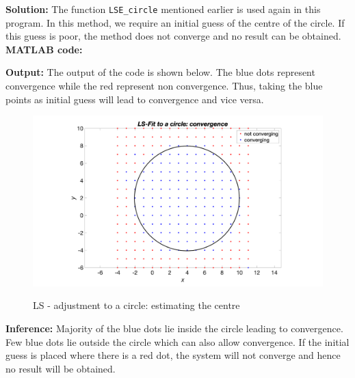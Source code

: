 \noindent \textbf{Solution:} The function \texttt{LSE\_circle} mentioned earlier is used again in this program. In this method, we require an initial guess of the centre of the circle. If this guess is poor, the method does not converge and no result can be obtained.
\noindent \textbf{MATLAB code:} 


\noindent \textbf{Output:} The output of the code is shown below. The blue dots represent convergence while the red represent non convergence. Thus, taking the blue points as initial guess will lead to convergence and vice versa.
\begin{figure}[H]
\centering
{\includegraphics[scale=0.15]{ass8_1.png}}
\caption{LS - adjustment to a circle: estimating the centre }
\label{LS - adjustment to a circle: estimating the centre }
\end{figure}

\noindent \textbf{Inference:} Majority of the blue dots lie inside the circle leading to convergence. Few blue dots lie outside the circle which can also allow convergence. If the initial guess is placed where there is a red dot, the system will not converge and hence no result will be obtained.